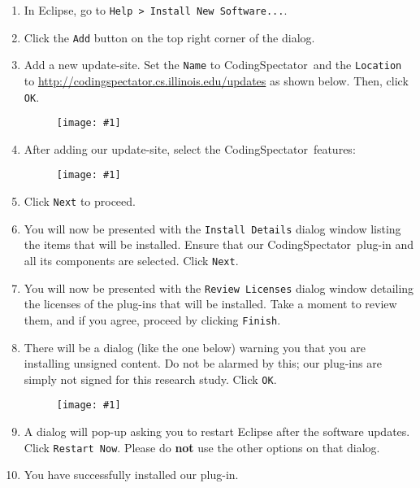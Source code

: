 \documentclass{article}
\newcommand\fig[1]{\texttt{[image: \#1]}}
\newcommand\codspec{CodingSpectator}
\newcommand\uiref[1]{\texttt{#1}}
\begin{document}
\begin{enumerate}
%
\item In Eclipse, go to \uiref{Help > Install New Software...}.
%
\item Click the \uiref{Add} button on the top right corner of the dialog.
%
\item Add a new update-site. Set the \uiref{Name} to \codspec\ and the
\uiref{Location} to \url{http://codingspectator.cs.illinois.edu/updates} as
shown below. Then, click \uiref{OK}.

\begin{figure}
%
\centering
%
\fig{figs/add_site}
%
\end{figure}

\item After adding our update-site, select the \codspec\ features:

\begin{figure}
%
\centering
%
\fig{figs/select_features}
%
\end{figure}

\item Click \uiref{Next} to proceed.

\item You will now be presented with the \uiref{Install Details} dialog window
listing the items that will be installed. Ensure that our \codspec\ plug-in and
all its components are selected. Click \uiref{Next}.

\item You will now be presented with the \uiref{Review Licenses} dialog window
detailing the licenses of the plug-ins that will be installed. Take a moment to
review them, and if you agree, proceed by clicking \uiref{Finish}.

\item There will be a dialog (like the one below) warning you that you are
installing unsigned content. Do not be alarmed by this; our plug-ins are simply
not signed for this research study. Click \uiref{OK}.

\begin{figure}
%
\centering
%
\fig{figs/warning}
%
\end{figure}

\item A dialog will pop-up asking you to restart Eclipse after the software
updates. Click \uiref{Restart Now}. Please do \textbf{not} use the other options
on that dialog.

\item You have successfully installed our plug-in.
%
\end{enumerate}
%
\end{document}
